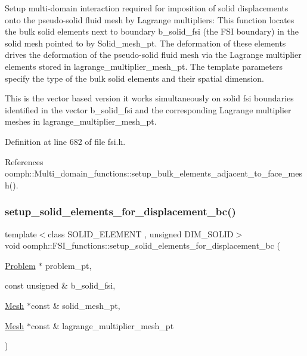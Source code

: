 Setup multi-\/domain interaction required for imposition of solid displacements onto the pseudo-\/solid fluid mesh by Lagrange multipliers\+: This function locates the bulk solid elements next to boundary b\+\_\+solid\+\_\+fsi (the F\+SI boundary) in the solid mesh pointed to by Solid\+\_\+mesh\+\_\+pt. The deformation of these elements drives the deformation of the pseudo-\/solid fluid mesh via the Lagrange multiplier elements stored in lagrange\+\_\+multiplier\+\_\+mesh\+\_\+pt. The template parameters specify the type of the bulk solid elements and their spatial dimension. 

This is the vector based version it works simultaneously on solid fsi boundaries identified in the vector b\+\_\+solid\+\_\+fsi and the corresponding Lagrange multiplier meshes in lagrange\+\_\+multiplier\+\_\+mesh\+\_\+pt. 

Definition at line 682 of file fsi.\+h.



References oomph\+::\+Multi\+\_\+domain\+\_\+functions\+::setup\+\_\+bulk\+\_\+elements\+\_\+adjacent\+\_\+to\+\_\+face\+\_\+mesh().

\mbox{\label{namespaceoomph_1_1FSI__functions_ad638257ef97a089f5367edf5d2911e60}} 
\subsubsection{\texorpdfstring{setup\+\_\+solid\+\_\+elements\+\_\+for\+\_\+displacement\+\_\+bc()}{setup\_solid\_elements\_for\_displacement\_bc()}\hspace{0.1cm}{\footnotesize\ttfamily [2/2]}}
{\footnotesize\ttfamily template$<$class S\+O\+L\+I\+D\+\_\+\+E\+L\+E\+M\+E\+NT , unsigned D\+I\+M\+\_\+\+S\+O\+L\+ID$>$ \\
void oomph\+::\+F\+S\+I\+\_\+functions\+::setup\+\_\+solid\+\_\+elements\+\_\+for\+\_\+displacement\+\_\+bc (\begin{DoxyParamCaption}\item[{\hyperlink{classoomph_1_1Problem}{Problem} $\ast$}]{problem\+\_\+pt,  }\item[{const unsigned \&}]{b\+\_\+solid\+\_\+fsi,  }\item[{\hyperlink{classoomph_1_1Mesh}{Mesh} $\ast$const \&}]{solid\+\_\+mesh\+\_\+pt,  }\item[{\hyperlink{classoomph_1_1Mesh}{Mesh} $\ast$const \&}]{lagrange\+\_\+multiplier\+\_\+mesh\+\_\+pt }\end{DoxyParamCaption})}



